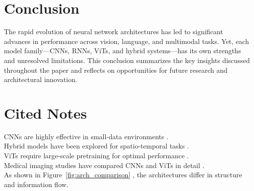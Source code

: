 \documentclass[12pt]{article}
\begin{document}
\section{Conclusion}
The rapid evolution of neural network architectures has led to significant
advances in performance across vision, language, and multimodal tasks. Yet,
each model family—CNNs, RNNs, ViTs, and hybrid systems—has its own strengths
and unresolved limitations. This conclusion summarizes the key insights
discussed throughout the paper and reflects on opportunities for future
research and architectural innovation.

\newpage



\section*{Cited Notes}

CNNs are highly effective in small-data environments \citep{alzubaidi2021review}. \\

Hybrid models have been explored for spatio-temporal tasks \citep{alomar2024har}. \\

ViTs require large-scale pretraining for optimal performance \citep{khan2023vision}. \\

Medical imaging studies have compared CNNs and ViTs in detail \citep{khan2024medical}. \\

As shown in Figure~\ref{fig:arch_comparison} \citep{MalhotraSingh2025}, the architectures differ in structure and information flow.
\end{document}
